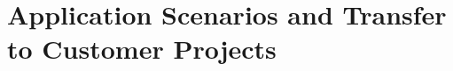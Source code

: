 \section{Application Scenarios and Transfer to Customer Projects}
\label{sec:einsatz-transfer}







